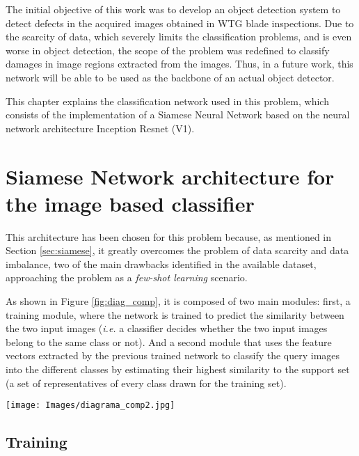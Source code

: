 \label{chapter:3}

The initial objective of this work was to develop an object detection system to detect defects in the acquired images obtained in WTG blade inspections. Due to the scarcity of data, which severely limits the classification problems, and is even worse in object detection, the scope of the problem was redefined to classify damages in image regions extracted from the images. Thus, in a future work, this network will be able to be used as the backbone of an actual object detector.

This chapter explains the classification network used in this problem, which consists of the implementation of a Siamese Neural Network based on the neural network architecture Inception Resnet (V1).

\section{Siamese Network architecture for the image based classifier}
\label{sec:siameseArchitecture}
This architecture has been chosen for this problem because, as mentioned in Section \ref{sec:siamese}, it greatly overcomes the problem of data scarcity and data imbalance, two of the main drawbacks identified in the available dataset, approaching the problem as a \emph{few-shot learning} scenario.

As shown in Figure \ref{fig:diag_comp}, it is composed of two main modules: first, a training module, where the network is trained to predict the similarity between the two input images (\emph{i.e.} a classifier decides whether the two input images belong to the same class or not). And a second module that uses the feature vectors extracted by the previous trained network to classify the query images into the different classes by estimating their highest similarity to the support set (a set of representatives of every class drawn for the training set).

\begin{figure*}[htbp]
        \centering
            \texttt{[image: Images/diagrama\_comp2.jpg]}
             \caption[Siamese architecture diagram. Train and inference.]
            {\small Siamese architecture diagram. Train and inference.}   
            \label{fig:diag_comp}
    \end{figure*}


\subsection{Training}
\label{subsec:train}

